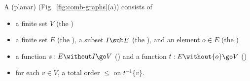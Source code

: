 \begin{defn}
\item A (planar) %
%
%
(Fig.~\ref{fig:comb-graphs}(a))
consists of
%
\begin{itemize}
\item a finite set $V$ (the )
\item a finite set $E$ (the ), a subset $I \sub E$ (the
), and an element $o \in E$ (the )
\item a function $s: E\without I \go V$ () and a function $t:
E\without \{o\} \go V$ ()
\item for each $v \in V$, a total order $\leq$ on $t^{-1}\{v\}$.
\end{itemize}
%
\end{defn}
%
